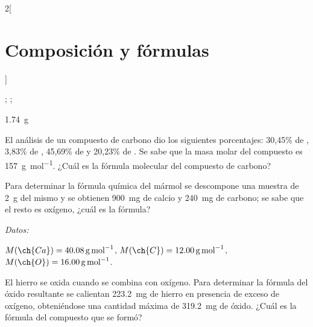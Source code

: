 \documentclass[10pt]{article}
\newenvironment{gexdatos}{
      \vspace{2pt}
      \noindent\textit{Datos:}
    }{\vspace{5pt}}
\begin{document}
\begin{multicols}{2}[
  \section{Composición y fórmulas}
  ]
  \begin{solution}
    \begin{enumerate*}
      \item {}; ;
      \item \SI{1.74}{\gram}
    \end{enumerate*}
  \end{solution}




  \begin{exercise}[
      tags    = {termodinámica, entalpía, entalpia de reacción, calor},
      topics  = {química, termoquímica, termodinámica},
      source  = {FQ 1B OXF 2015, p43, e46},
    ]
    El análisis de un compuesto de carbono dio los siguientes porcentajes: 30,45\% de , 3,83\% de , 45,69\% de  y 20,23\% de . Se sabe que la masa molar del compuesto es \SI{157}{\gram\per\mole}. ¿Cuál es la fórmula molecular del compuesto de carbono?
  \end{exercise}

  \begin{solution}
  \end{solution}




  \begin{exercise}[
      tags    = {termodinámica, entalpía, entalpia de reacción, calor},
      topics  = {química, termoquímica, termodinámica},
      source  = {FQ 1B SAN 2015, p44, e52},
    ]
    Para determinar la fórmula química del mármol se descompone una muestra de \SI{2}{\gram} del mismo y se obtienen \SI{900}{\milli\gram} de calcio y \SI{240}{\milli\gram} de carbono; se sabe que el resto es oxígeno, ¿cuál es la fórmula?

    \begin{gexdatos}
      \( M(\ch{Ca}) = \SI{40.08}{\gram\per\mole} \),
      \( M(\ch{C}) = \SI{12.00}{\gram\per\mole} \),
      \( M(\ch{O}) = \SI{16.00}{\gram\per\mole} \).
    \end{gexdatos}
  \end{exercise}

  \begin{solution}
  \end{solution}




  \begin{exercise}[
      tags    = {termodinámica, entalpía, entalpia de reacción, calor},
      topics  = {química, termoquímica, termodinámica},
      source  = {FQ 1B SAN 2015, p44, e53},
    ]
    El hierro se oxida cuando se combina con oxígeno. Para determinar la fórmula del óxido resultante se calientan \SI{223.2}{\milli\gram} de hierro en presencia de exceso de oxígeno, obteniéndose una cantidad máxima de \SI{319.2}{\milli\gram} de óxido. ¿Cuál es la fórmula del compuesto que se formó?


\end{exercise}
\end{multicols}
\end{document}
